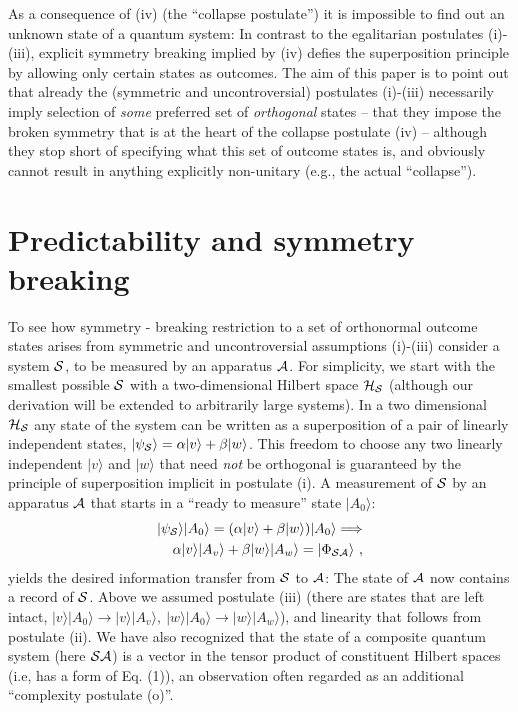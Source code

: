 \documentclass[aps,twocolumn,pra,onecolumn,12pt]{revtex4}
\newcommand{\ket}[1]    {| #1 \rangle}
\newcommand{\+}         {\dagger}
\begin{document}
As a consequence of (iv) (the ``collapse postulate'') it is impossible to find out an unknown state of a quantum system: In contrast to the egalitarian postulates (i)-(iii), explicit symmetry breaking implied by (iv) defies the superposition principle by allowing only certain states as outcomes. 
The aim of this paper is to point out that already the (symmetric and uncontroversial) postulates (i)-(iii) necessarily imply selection of  {\it some} preferred set of {\it orthogonal} states -- that they impose the broken symmetry that is at the heart of the collapse postulate (iv) -- although they stop short of specifying what this set of outcome states is, and obviously cannot result in anything explicitly non-unitary 
(e.g., the actual ``collapse''). 

 \section{Predictability and symmetry breaking}

To see how symmetry - breaking restriction to a set of orthonormal outcome states arises from 
symmetric and uncontroversial assumptions (i)-(iii) consider a system ${\cal S}$, to be 
measured by an apparatus ${\cal A}$. For simplicity, we start with the smallest possible ${\cal S}$ 
with a two-dimensional Hilbert space ${\cal H}_{\cal S}$ (although our derivation will be extended to arbitrarily large systems). In a two dimensional ${\cal H}_{\cal S}$ any state of the system can be written as a superposition of a pair of linearly independent states, $\ket {\psi_{\cal S}} = \alpha \ket v + \beta \ket w $. This freedom to choose any two linearly independent $\ket v$ and $\ket w$ that need {\it not} be orthogonal is guaranteed by the principle of superposition implicit in postulate (i). A measurement of ${\cal S}$ by an apparatus ${\cal A}$ that starts in a ``ready to measure'' state $\ket {A_0}$:
\begin{eqnarray}
\ket {\psi_{\cal S}}\ket {A_0}=( \alpha \ket v + \beta \ket w )\ket {A_0} \Longrightarrow \nonumber \\
  \alpha \ket v \ket {A_v}+ \beta \ket w \ket {A_w} = \ket {\Phi_{\cal SA}} \ ,
\end{eqnarray}
yields the desired information transfer from ${\cal S}$ to ${\cal A}$: The state of ${\cal A}$ now contains a record of ${\cal S}$. 
Above we assumed postulate (iii) (there are states that are left intact, $ \ket v \ket {A_0} \rightarrow \ket v \ket {A_v}, \ \ket w \ket {A_0} \rightarrow \ket w \ket {A_w} $),
and  linearity that follows from postulate (ii). We have also recognized that the state of a composite quantum system (here ${\cal SA}$) is a vector in the tensor product of constituent Hilbert spaces (i.e, has a form of Eq. (1)), an observation often regarded as an additional ``complexity postulate (o)''. 
\end{document}
